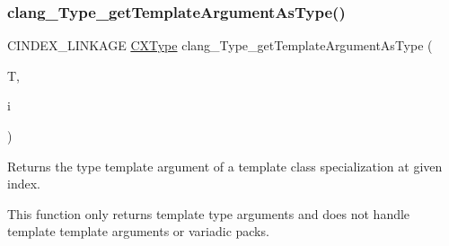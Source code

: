 \subsubsection{\texorpdfstring{clang\+\_\+\+Type\+\_\+get\+Template\+Argument\+As\+Type()}{clang\_Type\_getTemplateArgumentAsType()}}
{\footnotesize\ttfamily C\+I\+N\+D\+E\+X\+\_\+\+L\+I\+N\+K\+A\+GE \hyperlink{structCXType}{C\+X\+Type} clang\+\_\+\+Type\+\_\+get\+Template\+Argument\+As\+Type (\begin{DoxyParamCaption}\item[{\hyperlink{structCXType}{C\+X\+Type}}]{T,  }\item[{unsigned}]{i }\end{DoxyParamCaption})}



Returns the type template argument of a template class specialization at given index. 

This function only returns template type arguments and does not handle template template arguments or variadic packs. 